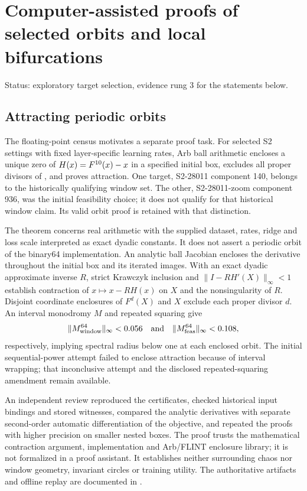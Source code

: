 \documentclass[11pt,letterpaper]{article}
\begin{document}
\section{Computer-assisted proofs of selected orbits and local bifurcations}
\label{sec:certificates}

\noindent Status: exploratory target selection, evidence rung 3 for the statements below.
\subsection{Attracting periodic orbits}

The floating-point census motivates a separate proof task. For \nCOneOrbits{} selected S2 settings with fixed layer-specific learning rates, Arb ball
arithmetic encloses a unique zero of $H(x)=F^{10}(x)-x$ in a specified initial box, excludes all proper
divisors of \nCOnePeriod{}, and proves attraction. One target, S2-28011 component 140, belongs to the
historically qualifying window set. The other, S2-28011-zoom component 936, was the initial feasibility choice;
it does not qualify for that historical window claim. Its valid orbit proof is retained with that distinction.

The theorem concerns real arithmetic with the supplied dataset, rates, ridge and loss scale interpreted as
exact dyadic constants. It does not assert a periodic orbit of the binary64 implementation. An analytic ball
Jacobian encloses the derivative throughout the initial box and its iterated images. With an exact dyadic
approximate inverse $R$, strict Krawczyk inclusion and
$\|I-RH'(X)\|_\infty<1$ establish contraction of $x\mapsto x-RH(x)$ on $X$ and the nonsingularity of $R$.
Disjoint coordinate enclosures of $F^d(X)$ and $X$ exclude each proper divisor $d$. An interval monodromy $M$
and repeated squaring give
\begin{equation}
\|M_{\mathrm{window}}^{64}\|_\infty < 0.056{}\quad\text{and}\quad
\|M_{\mathrm{feas}}^{64}\|_\infty < 0.108{},
\end{equation}
respectively, implying spectral radius below one at each enclosed orbit. The initial sequential-power attempt
failed to enclose attraction because of interval wrapping; that inconclusive attempt and the disclosed
repeated-squaring amendment remain available.

An independent review reproduced the certificates, checked historical input bindings and stored witnesses,
compared the analytic derivatives with separate second-order automatic differentiation of the objective, and
repeated the proofs with higher precision on smaller nested boxes. The proof trusts the mathematical
contraction argument, implementation and Arb/FLINT enclosure library; it is not formalized in a proof assistant.
It establishes neither surrounding chaos nor window geometry, invariant circles or training utility.
The authoritative artifacts and offline replay are documented in .
\end{document}
